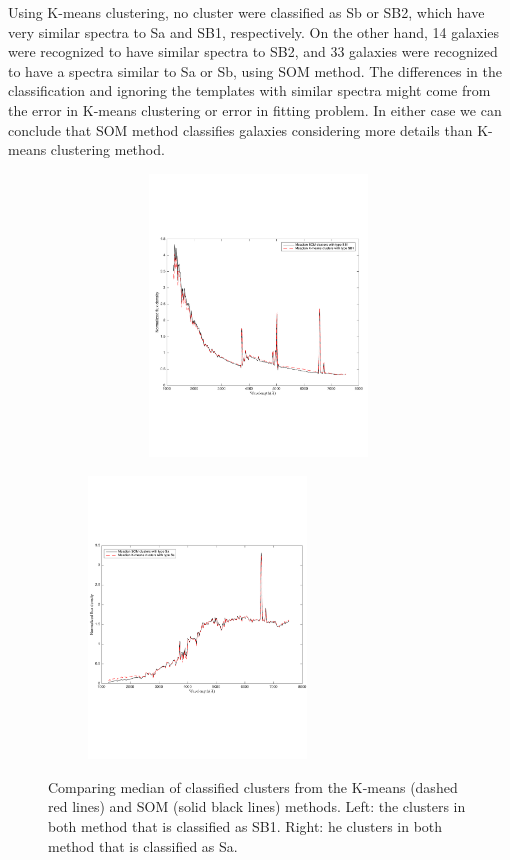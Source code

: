 Using K-means clustering, no cluster were classified as Sb or SB2, which have very similar spectra to Sa and SB1, respectively.
On the other hand, 14 galaxies were recognized to have similar spectra to SB2, and 33 galaxies were recognized to have a spectra similar to Sa or Sb, using SOM method.
The differences in the classification and ignoring the templates with similar spectra might come from the error in K-means clustering or error in fitting problem.
In either case we can conclude that SOM method classifies galaxies considering more details than K-means clustering method. 




\begin{figure}
                \begin{subfigure}[b]{0.49\textwidth}
                    \centering
                  \includegraphics[width=0.99\textwidth, height= 7.5cm]{k_means_images/SB1_comp.pdf}
                \end{subfigure}
                \hfill
                \begin{subfigure}[b]{0.49\textwidth}
                    \centering \includegraphics[width=\textwidth, height= 7.5cm]{k_means_images/Sa_comp.pdf}
                \end{subfigure}
                \caption{Comparing median of classified clusters from the K-means (dashed red lines) and SOM (solid black lines) methods. Left: the clusters in both method that is classified as SB1. Right: he clusters in both method that is classified as Sa.}
                 \label{fig: som_k_means_comp}
\end{figure}

